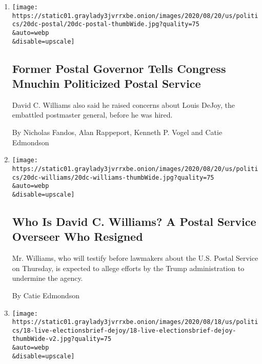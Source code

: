 \begin{enumerate}
\def\labelenumi{\arabic{enumi}.}
\item
  \href{/2020/08/20/us/politics/former-postal-governor-tells-congress-mnuchin-politicized-postal-service.html}{}

  \texttt{[image: https://static01.graylady3jvrrxbe.onion/images/2020/08/20/us/politics/20dc-postal/20dc-postal-thumbWide.jpg?quality=75\\\&auto=webp\\\&disable=upscale]}

  \hypertarget{former-postal-governor-tells-congress-mnuchin-politicized-postal-service}{%
  \subsection{Former Postal Governor Tells Congress Mnuchin Politicized
  Postal
  Service}\label{former-postal-governor-tells-congress-mnuchin-politicized-postal-service}}

  David C. Williams also said he raised concerns about Louis DeJoy, the
  embattled postmaster general, before he was hired.

  By Nicholas Fandos, Alan Rappeport, Kenneth P. Vogel and Catie
  Edmondson
\item
  \href{/2020/08/20/us/politics/david-williams-postal-service.html}{}

  \texttt{[image: https://static01.graylady3jvrrxbe.onion/images/2020/08/20/us/politics/20dc-williams/20dc-williams-thumbWide.jpg?quality=75\\\&auto=webp\\\&disable=upscale]}

  \hypertarget{who-is-david-c-williams-a-postal-service-overseer-who-resigned}{%
  \subsection{Who Is David C. Williams? A Postal Service Overseer Who
  Resigned}\label{who-is-david-c-williams-a-postal-service-overseer-who-resigned}}

  Mr. Williams, who will testify before lawmakers about the U.S. Postal
  Service on Thursday, is expected to allege efforts by the Trump
  administration to undermine the agency.

  By Catie Edmondson
\item
  \href{/2020/08/18/us/elections/louis-dejoy-the-postmaster-general-will-testify-before-the-senate-on-friday-about-service-cuts.html}{}

  \texttt{[image: https://static01.graylady3jvrrxbe.onion/images/2020/08/18/us/politics/18-live-electionsbrief-dejoy/18-live-electionsbrief-dejoy-thumbWide-v2.jpg?quality=75\\\&auto=webp\\\&disable=upscale]}


\end{enumerate}
